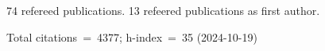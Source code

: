 74 refereed publications. 13 refeered publications as first author.

Total citations~=~4377; h-index~=~35 (2024-10-19)